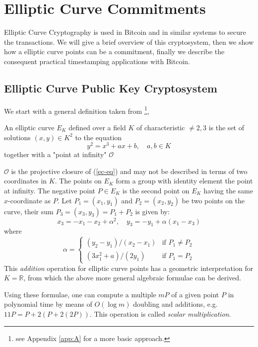\chapter{Elliptic Curve Commitments}
\label{chpr:ec-commitments}
Elliptic Curve Cryptography is used in Bitcoin and in similar systems to secure the transactions. 
We will give a brief overview of this cryptosystem, then we show how a elliptic curve points can be a commitment, finally we describe the consequent practical timestamping applications with Bitcoin.  

\section{Elliptic Curve Public Key Cryptosystem}
We start with a general definition taken from \cite{Koblitz1987}\footnote{see Appendix \ref{app:A} for a more basic approach.},
\begin{mydef}
	An elliptic curve $E_K$ defined over a field $K$ of characteristic $\neq 2, 3$ is the set of solutions $(x,y)\in K^2$ to the equation
	\begin{equation}
	\label{ec-eq}
	y^2 = x^3 + ax + b, \quad a,b \in K
	\end{equation}
	together with a "point at infinity" $\mathcal{O}$
\end{mydef}
$\mathcal{O}$ is the projective closure of (\ref{ec-eq}) and may not be described in terms of two coordinates in $K$.
The points on $E_K$ form a group with identity element the point at infinity. The negative point $P \in E_K$ is the second point on $E_K$ having the same $x$-coordinate as $P$. Let $P_1=(x_1,y_1)$ and $P_2=(x_2,y_2)$ be two points on the curve, their sum $P_3=(x_3,y_3) = P_1 + P_2$ is given by:
\begin{equation}
x_3 = -x_1 -x_2 + \alpha^2, \quad 
y_3 = -y_1 + \alpha(x_1 - x_3)
\end{equation}
where
\begin{equation}
\alpha = \begin{cases}
			(y_2 - y_1)/(x_2 - x_1) & \textrm{if } P_1 \neq P_2 \\
			(3x_1^2 + a)/(2y_1) & \textrm{if } P_1 = P_2
\end{cases}
\end{equation}
This \textit{addition} operation for elliptic curve points has a geometric interpretation for $K = \mathbb{R}$, from which the above more general algebraic formulae can be derived.

Using these formulae, one can compute a multiple $mP$ of a given point $P$ in polynomial time by means of $O(\log m)$ doubling and additions, e.g. $11P = P + 2(P + 2(2P))$. This operation is called \textit{scalar multiplication}.

